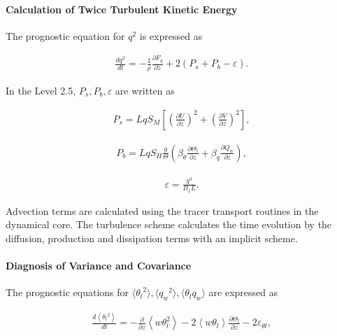 \hypertarget{calculation-of-twice-turbulent-kinetic-energy}{%
\paragraph{Calculation of Twice Turbulent Kinetic Energy}\label{calculation-of-twice-turbulent-kinetic-energy}}

The prognostic equation for \(q^2\) is expressed as

\begin{eqnarray} \frac{d q^2}{dt}=-\frac{1}{\rho}\frac{\partial F_q}{\partial z}+2\left(P_s+P_b-\varepsilon\right). \end{eqnarray}

In the Level 2.5, \(P_s,P_b,\varepsilon\) are written as

\begin{eqnarray}P_s=Lq S_M \left[\left(\frac{\partial U}{\partial z}\right)^2+\left(\frac{\partial V}{\partial z}\right)^2\right],\end{eqnarray}

\begin{eqnarray}P_b=Lq S_H \frac{g}{\Theta}\left(\beta_\theta \frac{\partial \Theta_l}{\partial z}+\beta_q \frac{\partial Q_w}{\partial z}\right),\end{eqnarray}

\begin{eqnarray}\varepsilon=\frac{q^3}{B_1L}.\end{eqnarray}

Advection terms are calculated using the tracer transport routines in the dynamical core. The turbulence scheme calculates the time evolution by the diffusion, production and dissipation terms with an
implicit scheme.

\hypertarget{diagnosis-of-variance-and-covariance}{%
\paragraph{Diagnosis of Variance and Covariance}\label{diagnosis-of-variance-and-covariance}}

The prognostic equations for \(\langle {\theta_l}^2 \rangle,\langle {q_w}^2 \rangle,\langle \theta_l q_w \rangle\) are expressed as

\begin{eqnarray}
\frac{d\left\langle{\theta_l}^{2}\right\rangle}{d t}=-\frac{\partial}{\partial z}\left\langle w \theta_{l}^{2}\right\rangle-2\left\langle w \theta_{l}\right\rangle \frac{\partial \Theta_{l}}{\partial z}-2 \varepsilon_{\theta l},
\end{eqnarray}

